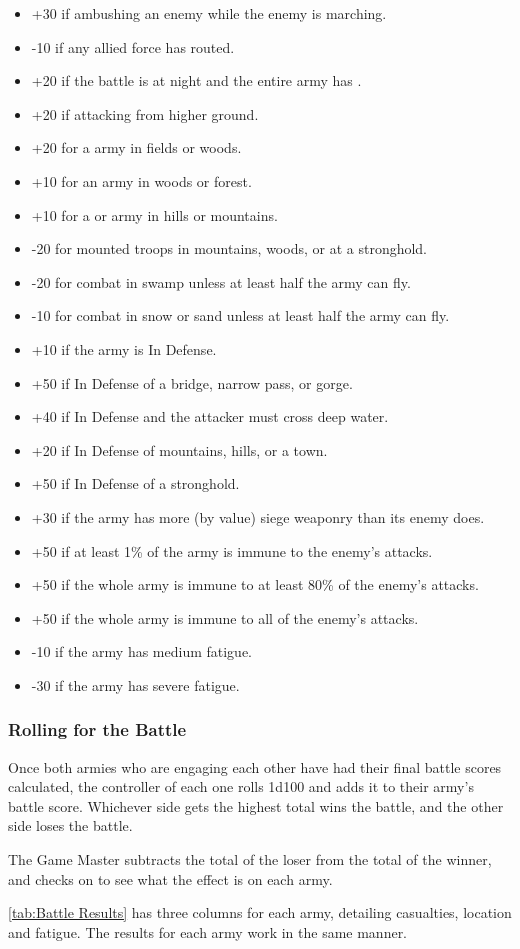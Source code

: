 \begin{multicols*}{2}
\begin{itemize}
	\item{+30 if ambushing an enemy while the enemy is marching.}
	\item{-10 if any allied force has routed.}
	\item{+20 if the battle is at night and the entire army has .}
	\item{+20 if attacking from higher ground.}
	\item{+20 for a  army in fields or woods.}
	\item{+10 for an  army in woods or forest.}
	\item{+10 for a  or  army in hills or mountains.}
	\item{-20 for mounted troops in mountains, woods, or at a stronghold.}
	\item{-20 for combat in swamp unless at least half the army can fly.}
	\item{-10 for combat in snow or sand unless at least half the army can fly.}
	\item{+10 if the army is In Defense.}
	\item{+50 if In Defense of a bridge, narrow pass, or gorge.}
	\item{+40 if In Defense and the attacker must cross deep water.}
	\item{+20 if In Defense of mountains, hills, or a town.}
	\item{+50 if In Defense of a stronghold.}
	\item{+30 if the army has more (by value) siege weaponry than its enemy does.}
	\item{+50 if at least 1\% of the army is immune to the enemy’s attacks.}
	\item{+50 if the whole army is immune to at least 80\% of the enemy’s attacks.}
	\item{+50 if the whole army is immune to all of the enemy’s attacks.}
	\item{-10 if the army has medium fatigue.}
	\item{-30 if the army has severe fatigue.}
\end{itemize}

\subsubsection{Rolling for the Battle}
Once both armies who are engaging each other have had their final battle scores calculated, the controller of each one rolls 1d100 and adds it to their army’s battle score. Whichever side gets the highest total wins the battle, and the other side loses the battle.

The Game Master subtracts the total of the loser from the total of the winner, and checks on  to see what the effect is on each army.

\autoref*{tab:Battle Results} has three columns for each army, detailing casualties, location and fatigue. The results for each army work in the same manner.

\end{multicols*}
